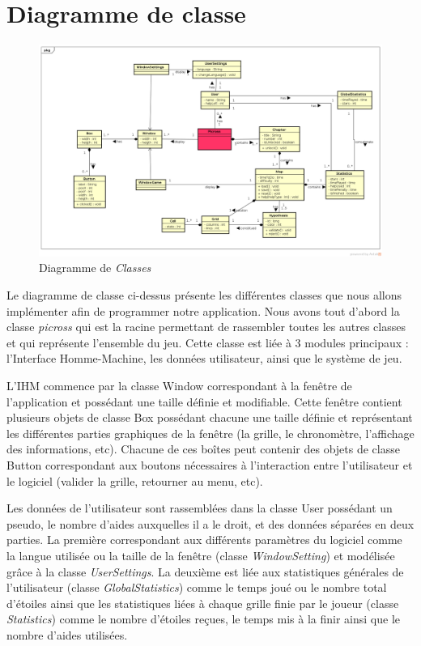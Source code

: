 \documentclass{report}
\begin{document}
    \section{Diagramme de classe}
    
    \begin{figure}[H]
	\caption{Diagramme de \textit{Classes}}
	\includegraphics[width=17cm]{../UML/Class_diagram/DiagrammeClasse.png}
    \end{figure}
    
    	
	Le diagramme de classe ci-dessus présente les différentes classes que nous allons implémenter afin de programmer notre application. Nous avons tout d’abord la classe \textit{picross} qui est la racine permettant de rassembler toutes les autres classes et qui représente l’ensemble du jeu. Cette classe est liée à 3 modules principaux : l’Interface Homme-Machine, les données utilisateur, ainsi que le système de jeu.

	L’IHM commence par la classe Window correspondant à la fenêtre de l’application et possédant une taille définie et modifiable. Cette fenêtre contient plusieurs objets de classe Box possédant chacune une taille définie et représentant les différentes parties graphiques de la fenêtre (la grille, le chronomètre, l’affichage des informations, etc). Chacune de ces boîtes peut contenir des objets de classe Button correspondant aux boutons nécessaires à l’interaction entre l’utilisateur et le logiciel (valider la grille, retourner au menu, etc).

	Les données de l’utilisateur sont rassemblées dans la classe User possédant un pseudo, le nombre d’aides auxquelles il a le droit, et des données séparées en deux parties. La première correspondant aux différents paramètres du logiciel comme la langue utilisée ou la taille de la fenêtre (classe \textit{WindowSetting}) et modélisée grâce à la classe \textit{UserSettings}. La deuxième est liée aux statistiques  générales de l’utilisateur (classe \textit{GlobalStatistics}) comme le temps joué ou le nombre total d’étoiles ainsi que les statistiques liées à chaque grille finie par le joueur (classe \textit{Statistics}) comme le nombre d’étoiles reçues, le temps mis à la finir ainsi que le nombre d’aides utilisées.
\end{document}

